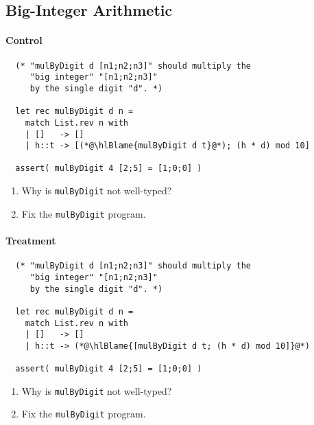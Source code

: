 \documentclass{article}
\newcommand\hlBlame[1]{\colorbox{red!25}{#1}}
\begin{document}
\subsection{Big-Integer Arithmetic}

\paragraph{Control}
\begin{lstlisting}
  (* "mulByDigit d [n1;n2;n3]" should multiply the
     "big integer" "[n1;n2;n3]"
     by the single digit "d". *)

  let rec mulByDigit d n =
    match List.rev n with
    | []   -> []
    | h::t -> [(*@\hlBlame{mulByDigit d t}@*); (h * d) mod 10]

  assert( mulByDigit 4 [2;5] = [1;0;0] )
\end{lstlisting}

\begin{enumerate}
\item Why is \verb!mulByDigit! not well-typed?
\item Fix the \verb!mulByDigit! program.
\end{enumerate}

\paragraph{Treatment}
\begin{lstlisting}
  (* "mulByDigit d [n1;n2;n3]" should multiply the
     "big integer" "[n1;n2;n3]"
     by the single digit "d". *)

  let rec mulByDigit d n =
    match List.rev n with
    | []   -> []
    | h::t -> (*@\hlBlame{[mulByDigit d t; (h * d) mod 10]}@*)

  assert( mulByDigit 4 [2;5] = [1;0;0] )
\end{lstlisting}

\begin{enumerate}
\item Why is \verb!mulByDigit! not well-typed?
\item Fix the \verb!mulByDigit! program.
\end{enumerate}
\end{document}
